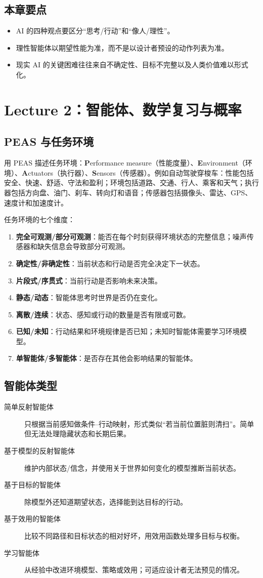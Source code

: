 \documentclass[UTF8,11pt,a4paper]{ctexart}
\begin{document}
\subsection{本章要点}
\begin{itemize}
\item AI 的四种观点要区分“思考/行动”和“像人/理性”。
\item 理性智能体以期望性能为准，而不是以设计者预设的动作列表为准。
\item 现实 AI 的关键困难往往来自不确定性、目标不完整以及人类价值难以形式化。
\end{itemize}

\section{Lecture 2：智能体、数学复习与概率}
\subsection{PEAS 与任务环境}
用 PEAS 描述任务环境：\textbf{P}erformance measure（性能度量）、\textbf{E}nvironment（环境）、\textbf{A}ctuators（执行器）、\textbf{S}ensors（传感器）。例如自动驾驶穿梭车：性能包括安全、快速、舒适、守法和盈利；环境包括道路、交通、行人、乘客和天气；执行器包括方向盘、油门、刹车、转向灯和语音；传感器包括摄像头、雷达、GPS、速度计和加速度计。

任务环境的七个维度：\begin{enumerate}
\item \textbf{完全可观测/部分可观测}：能否在每个时刻获得环境状态的完整信息；噪声传感器和缺失信息会导致部分可观测。
\item \textbf{确定性/非确定性}：当前状态和行动是否完全决定下一状态。
\item \textbf{片段式/序贯式}：当前行动是否影响未来决策。
\item \textbf{静态/动态}：智能体思考时世界是否仍在变化。
\item \textbf{离散/连续}：状态、感知或行动的数量是否有限或可数。
\item \textbf{已知/未知}：行动结果和环境规律是否已知；未知时智能体需要学习环境模型。
\item \textbf{单智能体/多智能体}：是否存在其他会影响结果的智能体。
\end{enumerate}

\subsection{智能体类型}
\begin{description}
\item[简单反射智能体] 只根据当前感知做条件--行动映射，形式类似“若当前位置脏则清扫”。简单但无法处理隐藏状态和长期后果。
\item[基于模型的反射智能体] 维护内部状态/信念，并使用关于世界如何变化的模型推断当前状态。
\item[基于目标的智能体] 除模型外还知道期望状态，选择能到达目标的行动。
\item[基于效用的智能体] 比较不同路径和目标状态的相对好坏，用效用函数处理多目标与权衡。
\item[学习智能体] 从经验中改进环境模型、策略或效用；可适应设计者无法预见的情况。
\end{description}
\end{document}
